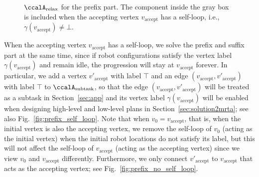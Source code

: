 \documentclass[Afour,sageh,times]{sagej}
\newcommand{\auto}[1]{\ccalA_{\text{#1}}}
\newcommand{\vertex}[1]{v_{\text{#1}}}
\newcommand{\domanda}[1]{\subsubsection*{#1}}
\begin{document}
\begin{figure}
  \centering
  \hspace{0.2em}
  \subfigure[$v_0= \vertex{accept}$ and $\gamma(v_0)$ is not satisfied by  initial robot locations]{
    \texttt{[image: prefix\_no\_self\_loop.pdf]}\label{fig:prefix_no_self_loop}}
  \caption{$\auto{relax}$ for the prefix part. The component inside the gray box is included when the accepting vertex $\vertex{accept}$ has a self-loop, i.e., $\gamma(\vertex{accept})\neq \bot$.}\label{fig:prefix}
\end{figure}

When the accepting vertex $\vertex{accept}$ has a self-loop, we solve the prefix and suffix part at the same time, since if robot configurations satisfy the vertex label $\gamma(\vertex{accept})$ and remain idle, the progression will stay at $\vertex{accept}$ forever.
In particular, we add a vertex $v'_{\text{accept}}$ with label $\top$ and an edge $(v_{\text{accept}}, v'_{\text{accept}})$ with label $\top$ to $\auto{subtask}$, so that the edge $(v_{\text{accept}}, v'_{\text{accept}})$ will be treated as a subtask in Section~\ref{sec:app} and its vertex label $\gamma(v_{\text{accept}})$ will be enabled when designing high-level and low-level plans in Section~\ref{sec:solution2mrta}; see also Fig.~\ref{fig:prefix_self_loop}.  Note that when $v_0 = v_{\text{accept}}$, that is, when the initial vertex is also the accepting vertex, we remove the self-loop of $v_0$ (acting as the initial vertex) when the initial robot locations do not satisfy its label, but this will not affect the self-loop of $\vertex{accept}$ (acting as the accepting vertex) since  we view $v_0$ and $v_{\text{accept}}$ differently. Furthermore, we only connect $v'_{\text{accept}}$ to $v_{\text{accept}}$ that acts as the accepting vertex; see Fig.~\ref{fig:prefix_no_self_loop}.
\end{document}
